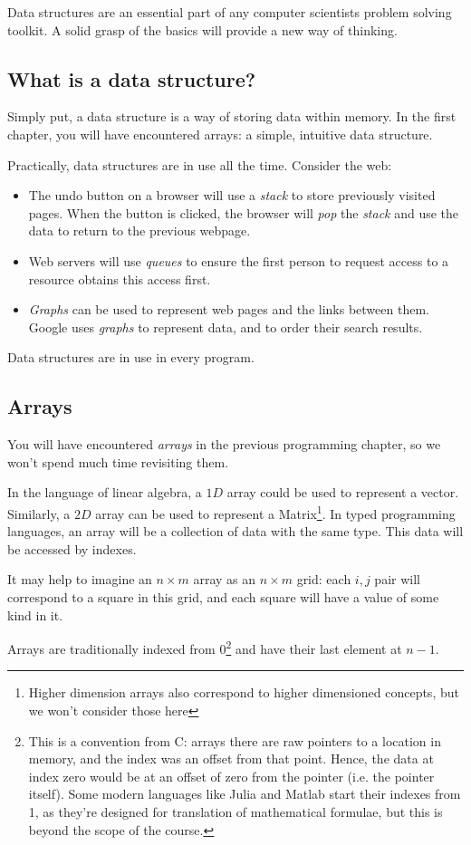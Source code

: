 \documentclass[../alevelcs.tex]{subfiles}
\begin{document}
	Data structures are an essential part of any computer scientists problem solving toolkit. A solid grasp of the basics will provide a new way of thinking.
	\tableofcontents
	\newpage

	\subsection{What is a data structure?}
	Simply put, a data structure is a way of storing data within memory. In the first chapter, you will have encountered arrays: a simple, intuitive data structure.

	Practically, data structures are in use all the time. Consider the web:
	\begin{itemize}
		\item The undo button on a browser will use a \textit{stack} to store previously visited pages. When the button is clicked, the browser will \textit{pop} the \textit{stack} and use the data to return to the previous webpage.
		\item Web servers will use \textit{queues} to ensure the first person to request access to a resource obtains this access first.
		\item \textit{Graphs} can be used to represent web pages and the links between them. Google uses \textit{graphs} to represent data, and to order their search results.
	\end{itemize}

	Data structures are in use in every program.

	\subsection{Arrays}
	You will have encountered \textit{arrays} in the previous programming chapter, so we won't spend much time revisiting them.

	In the language of linear algebra, a $1D$ array could be used to represent a vector. Similarly, a $2D$ array can be used to represent a Matrix\footnote{Higher dimension arrays also correspond to higher dimensioned concepts, but we won't consider those here}. In typed programming languages, an array will be a collection of data with the same type. This data will be accessed by indexes.

	It may help to imagine an $n \times m$ array as an $n \times m$ grid: each $i,j$ pair will correspond to a square in this grid, and each square will have a value of some kind in it.

	Arrays are traditionally indexed from 0\footnote{This is a convention from C: arrays there are raw pointers to a location in memory, and the index was an offset from that point. Hence, the data at index zero would be at an offset of zero from the pointer (i.e. the pointer itself). Some modern languages like Julia and Matlab start their indexes from 1, as they're designed for translation of mathematical formulae, but this is beyond the scope of the course.} and have their last element at $n - 1$.
\end{document}
